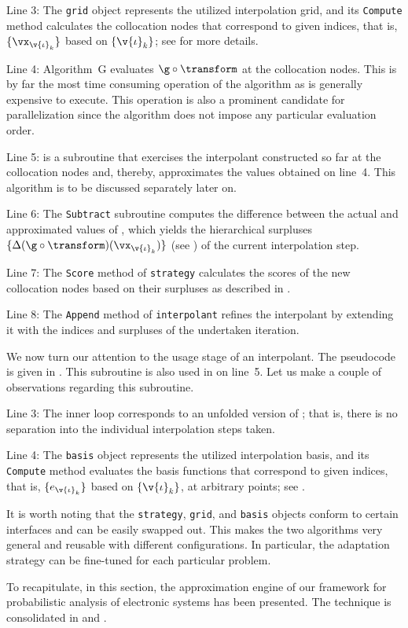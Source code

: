 Line 3: The \texttt{grid} object represents the utilized interpolation grid, and
its \texttt{Compute} method calculates the collocation nodes that correspond to
given indices, that is, $\{ \vx_{\v{\iota}_k} \}$ based on $\{ \v{\iota}_k \}$;
see  for more details.

Line 4: Algorithm~G evaluates $\g \circ \transform$ at the collocation nodes.
This is by far the most time consuming operation of the algorithm as \g is
generally expensive to execute. This operation is also a prominent candidate for
parallelization since the algorithm does not impose any particular evaluation
order.

Line 5:  is a subroutine that exercises the interpolant
constructed so far at the collocation nodes and, thereby, approximates the
values obtained on line~4. This algorithm is to be discussed separately later
on.

Line 6: The \texttt{Subtract} subroutine computes the difference between the
actual and approximated values of \g, which yields the hierarchical surpluses
$\{ \Delta(\g \circ \transform)(\vx_{\v{\iota}_k}) \}$ (see
) of the current interpolation step.

Line 7: The \texttt{Score} method of \texttt{strategy} calculates the scores of
the new collocation nodes based on their surpluses as described in
.

Line 8: The \texttt{Append} method of \texttt{interpolant} refines the
interpolant by extending it with the indices and surpluses of the undertaken
iteration.

We now turn our attention to the usage stage of an interpolant. The pseudocode
is given in . This subroutine is also used in
 on line~5. Let us make a couple of observations
regarding this subroutine.

Line 3: The inner loop corresponds to an unfolded version of
; that is, there is no separation into the individual
interpolation steps taken.

Line 4: The \texttt{basis} object represents the utilized interpolation basis,
and its \texttt{Compute} method evaluates the basis functions that correspond to
given indices, that is, $\{ e_{\v{\iota}_k} \}$ based on $\{ \v{\iota}_k \}$, at
arbitrary points; see .

It is worth noting that the \texttt{strategy}, \texttt{grid}, and \texttt{basis}
objects conform to certain interfaces and can be easily swapped out. This makes
the two algorithms very general and reusable with different configurations. In
particular, the adaptation strategy can be fine-tuned for each particular
problem.

\conclusioncut
To recapitulate, in this section, the approximation engine of our framework for
probabilistic analysis of electronic systems has been presented. The technique
is consolidated in  and .

